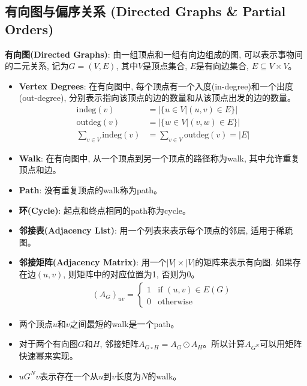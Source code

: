 \documentclass[12pt, a4paper, UTF8]{ctexart}
\newcommand{\term}[1]{\textbf{\textcolor{blue!80!black}{#1}}}
\newcommand{\emphb}[1]{\textbf{#1}}
\begin{document}
\begin{sloppypar}
    \subsection{有向图与偏序关系 (Directed Graphs \& Partial Orders)}
    \term{有向图(Directed Graphs)}: 由一组顶点和一组有向边组成的图, 可以表示事物间的二元关系, 记为$G = (V, E)$, 其中$V$是顶点集合, $E$是有向边集合, $E \subseteq V \times V$。
    \begin{itemize}[nosep]
        \item \emphb{Vertex Degrees}: 在有向图中, 每个顶点有一个入度(in-degree)和一个出度(out-degree), 分别表示指向该顶点的边的数量和从该顶点出发的边的数量。
              \begin{align*}
                  \text{indeg}(v)                & = |\{ u \in V | (u, v) \in E \}|        \\
                  \text{outdeg}(v)               & = |\{ w \in V | (v, w) \in E \}|        \\
                  \sum_{v \in V} \text{indeg}(v) & = \sum_{v \in V} \text{outdeg}(v) = |E|
              \end{align*}
        \item \emphb{Walk}: 在有向图中, 从一个顶点到另一个顶点的路径称为walk, 其中允许重复顶点和边。
        \item \emphb{Path}: 没有重复顶点的walk称为path。
        \item \emphb{环(Cycle)}: 起点和终点相同的path称为cycle。
        \item \emphb{邻接表(Adjacency List)}: 用一个列表来表示每个顶点的邻居, 适用于稀疏图。
        \item \emphb{邻接矩阵(Adjacency Matrix)}: 用一个$|V| \times |V|$的矩阵来表示有向图. 如果存在边$(u, v)$, 则矩阵中的对应位置为1, 否则为0。
              \begin{align*}
                  (A_G)_{uv} = \begin{cases}
                                   1 & \text{if } (u, v) \in E(G) \\
                                   0 & \text{otherwise}
                               \end{cases}
              \end{align*}
        \item 两个顶点$u$和$v$之间最短的walk是一个path。
        \item 对于两个有向图$G$和$H$, 邻接矩阵$A_{G \circ H} = A_G \odot A_H$。所以计算$A_{G^N}$可以用矩阵快速幂来实现。
        \item $u G^N v$表示存在一个从$u$到$v$长度为$N$的walk。

\end{itemize}
\end{sloppypar}
\end{document}
